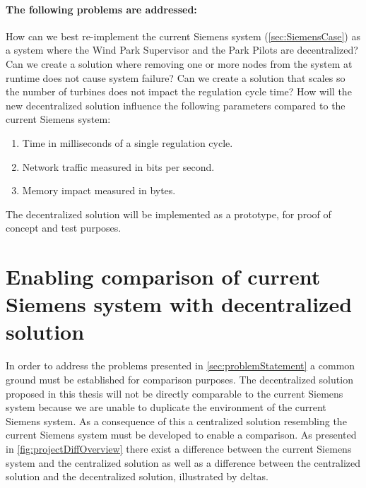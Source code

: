 \paragraph{The following problems are addressed:}
\begin{description} %
	 How can we best re-implement the current Siemens system (\cref{sec:SiemensCase}) as a system where the Wind Park Supervisor and the Park Pilots are decentralized?
	 Can we create a solution where removing one or more nodes from the system at runtime does not cause system failure?
	 Can we create a solution that scales so the number of turbines does not impact the regulation cycle time?
	 How will the new decentralized solution influence the following parameters compared to the current Siemens system:
	\begin{enumerate}
		\item Time in milliseconds of a single regulation cycle.
		\item Network traffic measured in bits per second.
		\item Memory impact measured in bytes.
	\end{enumerate}
\end{description}

The decentralized solution will be implemented as a prototype, for proof of concept and test purposes.

\section{Enabling comparison of current Siemens system with decentralized solution}
In order to address the problems presented in \cref{sec:problemStatement} a common ground must be established for comparison purposes. The decentralized solution proposed in this thesis will not be directly comparable to the current Siemens system because we are unable to duplicate the environment of the current Siemens system. As a consequence of this a centralized solution resembling the current Siemens system must be developed to enable a comparison. As presented in \cref{fig:projectDiffOverview} there exist a difference between the current Siemens system and the centralized solution as well as a difference between the centralized solution and the decentralized solution, illustrated by deltas.

